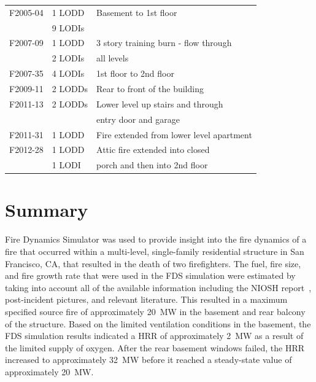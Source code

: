 \documentclass[12pt,oneside]{book}
\begin{document}
\begin{table}[!ht]
\begin{tabular}{lll}
F2005-04 \cite{NIOSH:McFall4}       &  1 LODD             &  Basement to 1st floor                     \\
                                    &  9 LODIs            &                                            \\
F2007-09 \cite{NIOSH:Tarley}        &  1 LODD             &  3 story training burn - flow through      \\
                                    &  2 LODIs            &  all levels                                \\
F2007-35 \cite{NIOSH:Braddee}       &  4 LODIs            &  1st floor to 2nd floor                    \\
F2009-11 \cite{NIOSH:Merinar}       &  2 LODDs            &  Rear to front of the building             \\
F2011-13 \cite{NIOSH:Bowyer2}       &  2 LODDs            &  Lower level up stairs and through         \\
                                    &                     &  entry door and garage                     \\
F2011-31 \cite{NIOSH:Loflin}        &  1 LODD             &  Fire extended from lower level apartment  \\
F2012-28 \cite{NIOSH:Bowyer}        &  1 LODD             &  Attic fire extended into closed           \\
                                    &  1 LODI             &  porch and then into 2nd floor             \\
\bottomrule
\end{tabular}
\label{tab:LODD}
\end{table}


\chapter{Summary}
\label{sec:summary}

Fire Dynamics Simulator was used to provide insight into the fire dynamics of a fire that occurred within a multi-level, single-family residential structure in San Francisco, CA, that resulted in the death of two firefighters. The fuel, fire size, and fire growth rate that were used in the FDS simulation were estimated by taking into account all of the available information including the NIOSH report~\cite{NIOSH:Bowyer2}, post-incident pictures, and relevant literature. This resulted in a maximum specified source fire of approximately 20~MW in the basement and rear balcony of the structure. Based on the limited ventilation conditions in the basement, the FDS simulation results indicated a HRR of approximately 2~MW as a result of the limited supply of oxygen. After the rear basement windows failed, the HRR increased to approximately 32~MW before it reached a steady-state value of approximately 20~MW.
\end{document}
